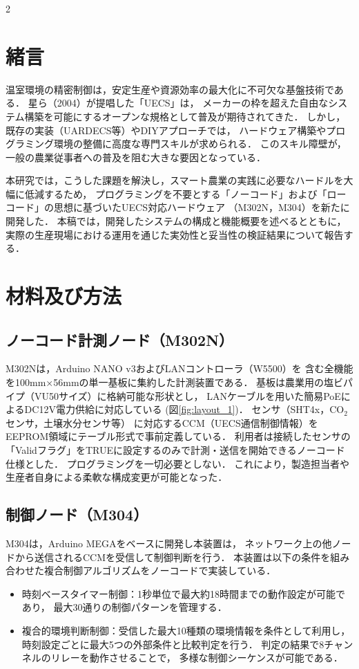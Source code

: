 \documentclass{jsaishoshiki}
\begin{document}
\begin{multicols}{2}
  
\section{緒言}
温室環境の精密制御は，安定生産や資源効率の最大化に不可欠な基盤技術である．%
星ら（2004）が提唱した「UECS」は，%
メーカーの枠を超えた自由なシステム構築を可能にするオープンな規格として普及が期待されてきた．%
しかし，既存の実装（UARDECS等）やDIYアプローチでは，%
ハードウェア構築やプログラミング環境の整備に高度な専門スキルが求められる．%
このスキル障壁が，一般の農業従事者への普及を阻む大きな要因となっている．

本研究では，こうした課題を解決し，スマート農業の実践に必要なハードルを大幅に低減するため，%
プログラミングを不要とする「ノーコード」および「ローコード」の思想に基づいたUECS対応ハードウェア%
（M302N，M304）を新たに開発した．
本稿では，開発したシステムの構成と機能概要を述べるとともに，%
実際の生産現場における運用を通じた実効性と妥当性の検証結果について報告する．

\section{材料及び方法}
\subsection{ノーコード計測ノード（M302N）}
M302Nは，Arduino NANO v3およびLANコントローラ（W5500）を%
含む全機能を100mm×56mmの単一基板に集約した計測装置である．
基板は農業用の塩ビパイプ（VU50サイズ）に格納可能な形状とし，
LANケーブルを用いた簡易PoEによるDC12V電力供給に対応している
(図\ref{fig:layout_1})．
センサ（SHT4x，CO$_2$センサ，土壌水分センサ等）%
に対応するCCM（UECS通信制御情報）をEEPROM領域にテーブル形式で事前定義している．
利用者は接続したセンサの「Validフラグ」をTRUEに設定するのみで計測・送信を開始できるノーコード仕様とした．
プログラミングを一切必要としない．
これにより，製造担当者や生産者自身による柔軟な構成変更が可能となった．

\subsection{制御ノード（M304）}
M304は，Arduino MEGAをベースに開発し本装置は，%
ネットワーク上の他ノードから送信されるCCMを受信して制御判断を行う．
本装置は以下の条件を組み合わせた複合制御アルゴリズムをノーコードで実装している．
\begin{itemize}
\item 時刻ベースタイマー制御：1秒単位で最大約18時間までの動作設定が可能であり，%
  最大30通りの制御パターンを管理する．
\item 複合的環境判断制御：受信した最大10種類の環境情報を条件として利用し，%
  時刻設定ごとに最大5つの外部条件と比較判定を行う．%
  判定の結果で8チャンネルのリレーを動作させることで，%
  多様な制御シーケンスが可能である．
\end{itemize}


\end{multicols}
\end{document}
